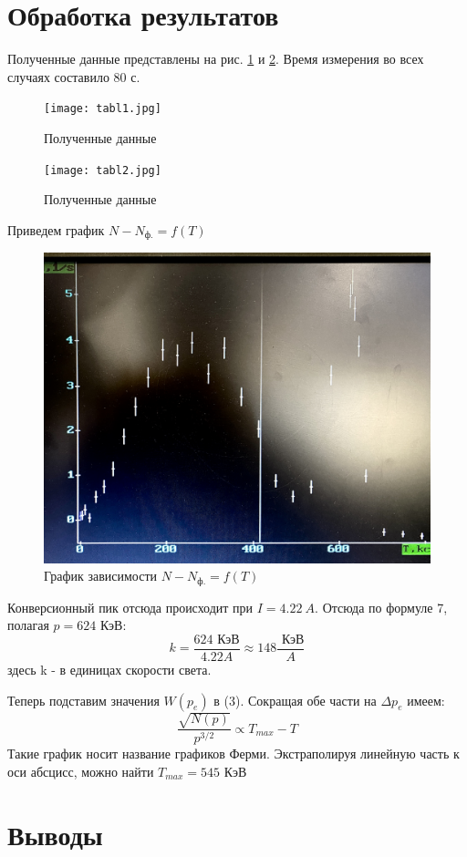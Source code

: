 \documentclass[a4paper, 12pt]{article}
\begin{document}
\section{Обработка результатов}
Полученные данные представлены на рис. \ref{fig:tabl1} и \ref{fig:tabl2}. Время измерения во всех случаях составило $80$ с.

\begin{figure}[H]
    \centering
    \texttt{[image: tabl1.jpg]}
    \caption{Полученные данные}
    \label{fig:tabl1}
\end{figure}

\begin{figure}[H]
    \centering
    \texttt{[image: tabl2.jpg]}
    \caption{Полученные данные}
    \label{fig:tabl2}
\end{figure}
Приведем график $N - N_{\text{ф.}} = f(T)$
\begin{figure}[H]
    \centering
    \includegraphics[width=1\textwidth]{NbyT.jpg}
    \caption{График зависимости $N - N_{\text{ф.}} = f(T)$}
    \label{fig:NbyT}
\end{figure}

Конверсионный пик отсюда происходит при $I = 4.22 \ A$. Отсюда по формуле 7, полагая $p = 624 \text{ КэВ}$:
\begin{equation}
	k = \frac{624 \text{ КэВ}}{4.22 A} \approx 148 \frac{\text{ КэВ}}{A}
\end{equation}
здесь k - в единицах скорости света.

Теперь подставим значения $W(p_e)$ в (3). Сокращая обе части на $\Delta p_e$ имеем:
\begin{equation}
	\frac{\sqrt{N(p)}}{p^{3/2}} \propto T_{max} - T
\end{equation}
Такие график носит название графиков Ферми. Экстраполируя линейную часть к оси абсцисс, можно найти $T_{max} = 545 \text{ КэВ}$



\section{Выводы}
\end{document}
